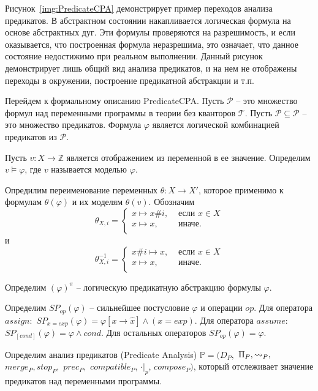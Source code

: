 Рисунок~\ref{img:PredicateCPA} демонстрирует пример переходов анализа предикатов. 
В абстрактном состоянии накапливается логическая формула на основе абстрактных дуг.
Эти формулы проверяются на разрешимость, и если оказывается, что построенная формула неразрешима, это означает, что данное состояние недостижимо при реальном выполнении.
Данный рисунок демонстрирует лишь общий вид анализа предикатов, и на нем не отображены переходы в окружении, построение предикатной абстракции и т.п.

Перейдем к формальному описанию PredicateCPA.
Пусть $\mathscr{P}$ -- это множество формул над переменными программы в теории без кванторов $\mathscr{T}$.
Пусть $\mathcal{P} \subseteq \mathscr{P}$ -- это множество предикатов.
Формула $\varphi$ является логической комбинацией предикатов из $\mathscr{P}$.

Пусть $v: X \to \mathbb{Z}$ является отображением из переменной в ее значение.
Определим $v \models \varphi$, где $v$ называется моделью $\varphi$.

Опредилим переименование переменных $\theta: X \to X'$, которое применимо к формулам $\theta(\varphi)$ и их моделям $\theta(v)$.
Обозначим
$$\theta_{X,i}= 
\left\lbrace\begin{array}{ll}
x \mapsto x\#i, & \mbox{ если } x \in X\\
x \mapsto x, &\mbox{ иначе}.\\
\end{array}
\right.
$$
и
$$\theta_{X,i}^{-1}= 
\left\lbrace\begin{array}{ll}
x\#i \mapsto x, & \mbox{ если } x \in X\\
x \mapsto x, &\mbox{ иначе}.\\
\end{array}
\right.
$$

Определим $(\varphi)^\pi$ -- логическую предикатную абстракцию формулы $\varphi$.

Определим $SP_{op}(\varphi)$ -- сильнейшее постусловие $\varphi$ и операции $op$.
Для оператора $assign:$ $SP_{x = exp}(\varphi) = \varphi[x \rightarrow \hat x] \land ( x = exp)$.
Для оператора $assume:$ $SP_{[cond]}(\varphi) = \varphi \land cond$.
Для остальных операторов $SP_{op}(\varphi) = \varphi$.


Определим анализ предикатов (Predicate Analysis) $\mathbb{P}=(D_{P},$ $\Pi_{P}, \leadsto_{P},$ $merge_{P}, stop_{P},$ $prec_{P},$ $compatible_{P}$, $\cdot|_p$, $compose_P)$, который отслеживает значение предикатов над переменными программы.

